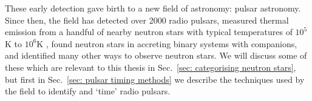 These early detection gave birth to a new field of astronomy: pulsar astronomy.
Since then, the field has detected over 2000 radio pulsars, measured thermal
emission from a handful of nearby neutron stars with typical temperatures of
$10^{5}$K to $10^{6}$K \citep{pavlov2003thermal}, found neutron stars in
accreting binary systems with companions, and identified many other ways to
observe neutron stars. We will discuss some of these which are relevant to this
thesis in Sec.~\ref{sec: categorising neutron stars}, but first in
Sec.~\ref{sec: pulsar timing methods} we describe the techniques used by the
field to identify and `time' radio pulsars.
